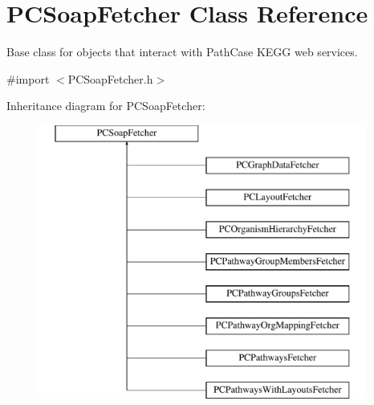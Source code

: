 \hypertarget{interface_p_c_soap_fetcher}{
\section{PCSoapFetcher Class Reference}
\label{interface_p_c_soap_fetcher}
}


Base class for objects that interact with PathCase KEGG web services.  




{\ttfamily \#import $<$PCSoapFetcher.h$>$}

Inheritance diagram for PCSoapFetcher:\begin{figure}[h!]
\begin{center}
\leavevmode
\includegraphics[height=9.000000cm]{kegg_doc/interface_p_c_soap_fetcher}
\end{center}
\end{figure}
